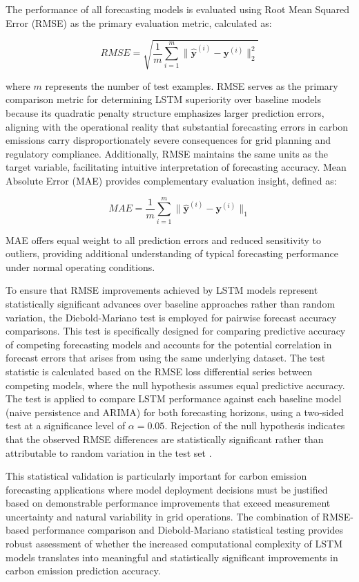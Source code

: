 The performance of all forecasting models is evaluated using Root Mean Squared Error (RMSE) as the primary evaluation metric, calculated as:

\[
  RMSE = \sqrt{\frac{1}{m}\sum_{i=1}^{m}\|\mathbf{\hat{y}}^{(i)} - \mathbf{y}^{(i)}\|_2^2}
\]

where \(m\) represents the number of test examples. RMSE serves as the primary comparison metric for determining LSTM superiority over baseline models because its quadratic penalty structure emphasizes larger prediction errors, aligning with the operational reality that substantial forecasting errors in carbon emissions carry disproportionately severe consequences for grid planning and regulatory compliance. Additionally, RMSE maintains the same units as the target variable, facilitating intuitive interpretation of forecasting accuracy.
Mean Absolute Error (MAE) provides complementary evaluation insight, defined as:

\[
  MAE = \frac{1}{m}\sum_{i=1}^{m}\|\mathbf{\hat{y}}^{(i)} - \mathbf{y}^{(i)}\|_1
\]

MAE offers equal weight to all prediction errors and reduced sensitivity to outliers, providing additional understanding of typical forecasting performance under normal operating conditions.

To ensure that RMSE improvements achieved by LSTM models represent statistically significant advances over baseline approaches rather than random variation, the Diebold-Mariano test is employed for pairwise forecast accuracy comparisons. This test is specifically designed for comparing predictive accuracy of competing forecasting models and accounts for the potential correlation in forecast errors that arises from using the same underlying dataset. The test statistic is calculated based on the RMSE loss differential series between competing models, where the null hypothesis assumes equal predictive accuracy. The test is applied to compare LSTM performance against each baseline model (naive persistence and ARIMA) for both forecasting horizons, using a two-sided test at a significance level of \(\alpha = 0.05\). Rejection of the null hypothesis indicates that the observed RMSE differences are statistically significant rather than attributable to random variation in the test set \parencite{diebold1995}.

This statistical validation is particularly important for carbon emission forecasting applications where model deployment decisions must be justified based on demonstrable performance improvements that exceed measurement uncertainty and natural variability in grid operations. The combination of RMSE-based performance comparison and Diebold-Mariano statistical testing provides robust assessment of whether the increased computational complexity of LSTM models translates into meaningful and statistically significant improvements in carbon emission prediction accuracy.

